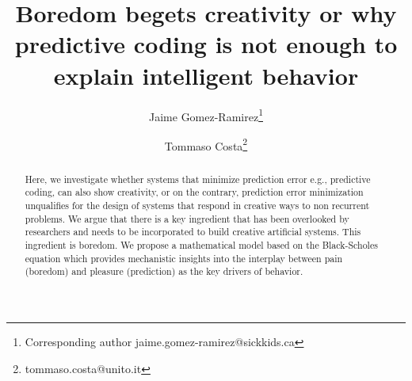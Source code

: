 \documentclass[11pt, onecolumn]{article}
\begin{document}
\title{Boredom begets creativity or why predictive coding is not enough to explain intelligent behavior}

\author[1]{Jaime Gomez-Ramirez\thanks{Corresponding author \hspace{0.6cm} jaime.gomez-ramirez@sickkids.ca}}
\author[2]{Tommaso Costa\thanks{\hspace{0.6cm} tommaso.costa@unito.it}}

\date{}
\maketitle

\begin{abstract}
Here, we investigate whether systems that minimize prediction error e.g., predictive coding, can also show creativity, or on the contrary, prediction error minimization unqualifies for the design of systems that respond in creative ways to non recurrent problems. 
We argue that there is a key ingredient that has been overlooked by researchers and needs to be incorporated to build creative artificial systems. This ingredient is boredom. We propose a mathematical model based on the Black-Scholes equation which provides mechanistic insights into the interplay between pain (boredom) and pleasure (prediction) as the key drivers of behavior.
\end{abstract}
\end{document}
